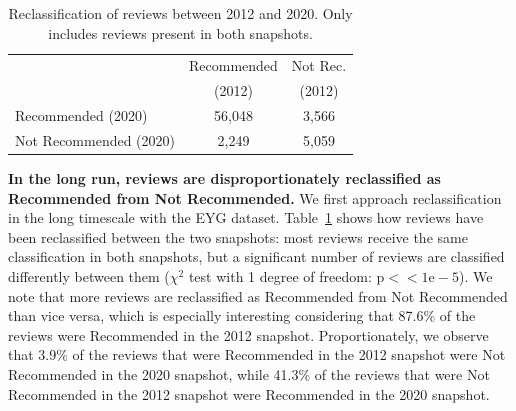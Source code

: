 
\begin{table}[t]
    \centering
    \caption{Reclassification of reviews between 2012 and 2020. Only includes reviews present in both snapshots.}%
    \label{tab:reclassification}
    \begin{tabular}{lcc}
		  \toprule
      & Recommended &  Not Rec. \\
			& (2012) & (2012) \\
			\midrule
      Recommended (2020) & 56,048 & 3,566 \\
      Not Recommended (2020)& 2,249 & 5,059\\
			\bottomrule
    \end{tabular}
\end{table}



\textbf{In the long run, reviews are disproportionately reclassified as Recommended from Not Recommended.}
We first approach reclassification in the long timescale with the EYG dataset. Table~\ref{tab:reclassification} shows how reviews have been reclassified between the two snapshots: most reviews receive the same classification in both snapshots, but a significant number of reviews are classified differently between them ($\chi^2$ test with 1 degree of freedom: $\text{p}<<1\text{e}-5$). We note that more reviews are reclassified as Recommended from Not Recommended than vice versa, which is especially interesting considering that 87.6\% of the reviews were Recommended in the 2012 snapshot. Proportionately, we observe that 3.9\% of the reviews that were Recommended in the 2012 snapshot were Not Recommended in the 2020 snapshot, while 41.3\% of the reviews that were Not Recommended in the 2012 snapshot were Recommended in the 2020 snapshot.

